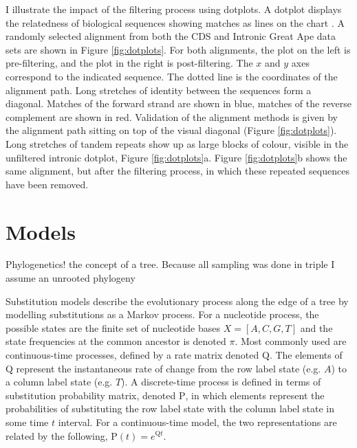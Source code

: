 I illustrate the impact of the filtering process using dotplots. A dotplot displays the relatedness of biological sequences showing matches as lines on the chart \citep{Gibbs1970TheSequences}. A randomly selected alignment from both the CDS and Intronic Great Ape data sets are shown in Figure \ref{fig:dotplots}. For both alignments, the plot on the left is pre-filtering, and the plot in the right is post-filtering. The $x$ and $y$ axes correspond to the indicated sequence. The dotted line is the coordinates of the alignment path. Long stretches of identity between the sequences form a diagonal. Matches of the forward strand are shown in blue, matches of the reverse complement are shown in red. Validation of the alignment methods is given by the alignment path sitting on top of the visual diagonal (Figure \ref{fig:dotplots}). Long stretches of tandem repeats show up as large blocks of colour, visible in the unfiltered intronic dotplot, Figure \ref{fig:dotplots}a. Figure \ref{fig:dotplots}b shows the same alignment, but after the filtering process, in which these repeated sequences have been removed.



\section{Models}

Phylogenetics! the concept of a tree. Because all sampling was done in triple I assume an unrooted phylogeny

Substitution models describe the evolutionary process along the edge of a tree by modelling substitutions as a Markov process. For a nucleotide process, the possible states are the finite set of nucleotide bases $X = [A, C, G, T]$ and the state frequencies at the common ancestor is denoted $\pi$. Most commonly used are continuous-time processes, defined by a rate matrix denoted $\mathrm{Q}$. The elements of $\mathrm{Q}$ represent the instantaneous rate of change from the row label state (e.g. $A$) to a column label state (e.g. $T$). A discrete-time process is defined in terms of substitution probability matrix, denoted $\mathrm{P}$, in which elements represent the probabilities of substituting the row label state with the column label state in some time $t$ interval. For a continuous-time model, the two representations are related by the following, $\mathrm{P}(t) = e^{\mathrm{Q}t}$. 

